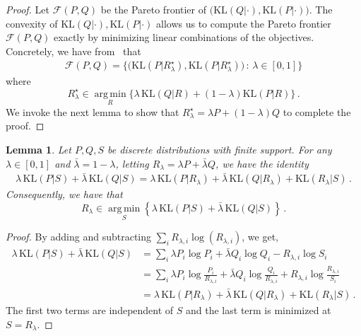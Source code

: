 \documentclass{article}
\newcommand \Fcal {\mathcal F}
\newtheorem{lemma}[theorem]{Lemma}
\theoremstyle{definition}
\newcommand{\kl}{{\mathrm{KL}}}
\newcommand \argmin {\operatorname*{arg\,min}} %
\begin{document}
\begin{proof}
%
%
%
%
%
%
%
%
%
%
%
Let $\Fcal(P, Q)$ be the Pareto frontier 
of $\big(\kl(Q|\cdot), \kl(P | \cdot)\big)$.
%
%
%
%
%
%
%
%
%
The convexity of $\kl(Q|\cdot), \kl(P | \cdot)$
allows us to compute the Pareto frontier $\Fcal(P, Q)$ 
exactly by minimizing linear combinations of the objectives.
Concretely, we have from~\cite[Thm. 3.4.5, 3.5.4]{miettinen2012nonlinear} that
\begin{align*}
    \Fcal(P, Q) = 
    \Big\{
        \big(\kl(P|R_\lambda^\star),
        \kl(P|R_\lambda^\star)\big) \,:\,
        \lambda \in [0, 1]
    \Big\}
\end{align*}
where
\[
    R_\lambda^\star \in 
    \argmin_R\{ \lambda\, \kl(Q|R) + 
    (1-\lambda) \kl(P|R) \} \,.
\]
We invoke the next lemma to 
show that $R_\lambda^\star = \lambda P + (1-\lambda) Q$ to complete the proof.
%
%
%
%
%
%
%
%
\end{proof}

\begin{lemma} \label{lem:tech:KL:3pt_weighted}
	Let $P, Q, S$ be discrete distributions with finite support.
	For any $\lambda \in [0, 1]$ and $\bar \lambda = 1- \lambda$, 
	letting $R_\lambda = \lambda P + \bar \lambda Q$, 
	we have the identity
%
%
%
%
%
%
		\begin{align*}
		\lambda \, \kl(P|S) + \bar \lambda \, \kl(Q|S)
		= 
		\lambda \, \kl(P| R_\lambda) + \bar\lambda\,  \kl(Q|R_\lambda)
			+ \kl(R_\lambda|S) \,.
	\end{align*}
	Consequently, we have that 
	\[
	R_\lambda \in 
	\argmin_S \left\{\lambda \, \kl(P|S) + \bar \lambda\, \kl(Q|S) \right\} \,.
	\]
\end{lemma}
\begin{proof}
	By adding and subtracting 
	$\sum_{i} R_{\lambda, i} \log(R_{\lambda, i})$, we get,
%
%
%
%
%
%
%
%
%
%
%
%
%
%
		\begin{align*}
		\lambda \, \kl(P|S) + \bar \lambda \, \kl(Q|S) 
		&= \sum_{i}  \lambda P_i \log P_i + \bar\lambda  Q_i \log Q_i -
				R_{\lambda, i} \log S_i  \\
	    &= \sum_i  \lambda P_i \log \frac{P_i}{R_{\lambda, i}} 
	        + \bar \lambda Q_i \log\frac{Q_i}{R_{\lambda, i}} + R_{\lambda, i} \log\frac{R_{\lambda, i}}{S_i} \\
	    &= \lambda \, \kl(P| R_\lambda) + \bar\lambda \, \kl(Q|R_\lambda)
			+ \kl(R_\lambda|S) \,.
%
%
%
%
%
	\end{align*}
	The first two terms are independent 
	of $S$ and the last term is minimized 
	at $S = R_\lambda$.
\end{proof}
\end{document}
